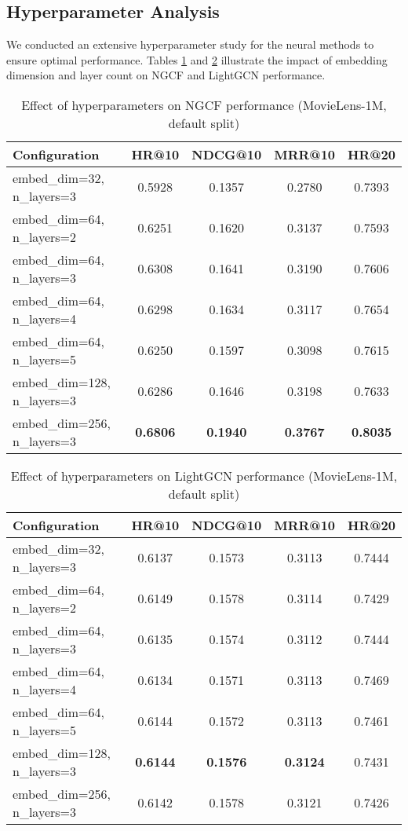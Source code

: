 \documentclass[sigconf,nonacm]{acmart} %
\begin{document}
\subsection{Hyperparameter Analysis}  

We conducted an extensive hyperparameter study for the neural methods to ensure optimal performance. Tables \ref{tab:ngcf-hyper} and \ref{tab:lightgcn-hyper} illustrate the impact of embedding dimension and layer count on NGCF and LightGCN performance.  

\begin{table}[ht]  
\caption{Effect of hyperparameters on NGCF performance (MovieLens-1M, default split)}  
\label{tab:ngcf-hyper}  
\centering  
\scriptsize  
\setlength{\tabcolsep}{4pt}  
\begin{tabular}{lcccc}  
\hline  
\textbf{Configuration} & \textbf{HR@10} & \textbf{NDCG@10} & \textbf{MRR@10} & \textbf{HR@20} \\
\hline  
embed\_dim=32, n\_layers=3 & 0.5928 & 0.1357 & 0.2780 & 0.7393 \\
embed\_dim=64, n\_layers=2 & 0.6251 & 0.1620 & 0.3137 & 0.7593 \\
embed\_dim=64, n\_layers=3 & 0.6308 & 0.1641 & 0.3190 & 0.7606 \\
embed\_dim=64, n\_layers=4 & 0.6298 & 0.1634 & 0.3117 & 0.7654 \\
embed\_dim=64, n\_layers=5 & 0.6250 & 0.1597 & 0.3098 & 0.7615 \\
embed\_dim=128, n\_layers=3 & 0.6286 & 0.1646 & 0.3198 & 0.7633 \\
embed\_dim=256, n\_layers=3 & \textbf{0.6806} & \textbf{0.1940} & \textbf{0.3767} & \textbf{0.8035} \\
\hline  
\end{tabular}  
\end{table}  

\begin{table}[ht]  
\caption{Effect of hyperparameters on LightGCN performance (MovieLens-1M, default split)}  
\label{tab:lightgcn-hyper}  
\centering  
\scriptsize  
\setlength{\tabcolsep}{4pt}  
\begin{tabular}{lcccc}  
\hline  
\textbf{Configuration} & \textbf{HR@10} & \textbf{NDCG@10} & \textbf{MRR@10} & \textbf{HR@20} \\
\hline  
embed\_dim=32, n\_layers=3 & 0.6137 & 0.1573 & 0.3113 & 0.7444 \\
embed\_dim=64, n\_layers=2 & 0.6149 & 0.1578 & 0.3114 & 0.7429 \\
embed\_dim=64, n\_layers=3 & 0.6135 & 0.1574 & 0.3112 & 0.7444 \\
embed\_dim=64, n\_layers=4 & 0.6134 & 0.1571 & 0.3113 & 0.7469 \\
embed\_dim=64, n\_layers=5 & 0.6144 & 0.1572 & 0.3113 & 0.7461 \\
embed\_dim=128, n\_layers=3 & \textbf{0.6144} & \textbf{0.1576} & \textbf{0.3124} & 0.7431 \\
embed\_dim=256, n\_layers=3 & 0.6142 & 0.1578 & 0.3121 & 0.7426 \\
\hline  
\end{tabular}  
\end{table}  
\end{document}
